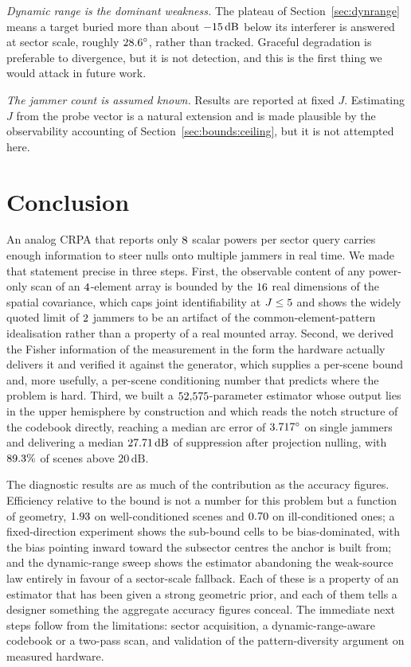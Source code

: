 \documentclass[journal]{IEEEtran}
\newcommand{\dB}{\,\mathrm{dB}}
\newcommand{\degs}{^\circ}
\begin{document}
\emph{Dynamic range is the dominant weakness.} The plateau of
Section~\ref{sec:dynrange} means a target buried more than about
$\drPlateauOnset\dB$ below its interferer is answered at sector scale, roughly
$\sectorRadius\degs$, rather than tracked. Graceful degradation is preferable
to divergence, but it is not detection, and this is the first thing we would
attack in future work.

\emph{The jammer count is assumed known.} Results are reported at fixed $J$.
Estimating $J$ from the probe vector is a natural extension and is made
plausible by the observability accounting of
Section~\ref{sec:bounds:ceiling}, but it is not attempted here.

\section{Conclusion}
\label{sec:concl}

An analog CRPA that reports only $8$ scalar powers per sector query
carries enough information to steer nulls onto multiple jammers in real time.
We made that statement precise in three steps. First, the observable content of
any power-only scan of an $4$-element array is bounded by the
$16$ real dimensions of the spatial covariance, which caps joint
identifiability at $J \le 5$ and shows the widely quoted limit of
$2$ jammers to be an artifact of the common-element-pattern
idealisation rather than a property of a real mounted array. Second, we derived
the Fisher information of the measurement in the form the hardware actually
delivers it and verified it against the generator, which supplies a per-scene
bound and, more usefully, a per-scene conditioning number that predicts where
the problem is hard. Third, we built a $52{,}575$-parameter estimator
whose output lies in the upper hemisphere by construction and which reads the
notch structure of the codebook directly, reaching a median arc error of
$\netArcPfifty\degs$ on single jammers and delivering a median
$\jsrMed\dB$ of suppression after projection nulling, with $89.3\%$ of
scenes above $20\dB$.

The diagnostic results are as much of the contribution as the accuracy
figures. Efficiency relative to the bound is not a number for this problem but
a function of geometry, $1.93$ on well-conditioned scenes and $0.70$ on
ill-conditioned ones; a fixed-direction experiment shows the sub-bound cells to
be bias-dominated, with the bias pointing inward toward the subsector centres
the anchor is built from; and the dynamic-range sweep shows the estimator
abandoning the weak-source law entirely in favour of a sector-scale fallback.
Each of these is a property of an estimator that has been given a strong
geometric prior, and each of them tells a designer something the aggregate
accuracy figures conceal. The immediate next steps follow from the limitations:
sector acquisition, a dynamic-range-aware codebook or a two-pass scan, and
validation of the pattern-diversity argument on measured hardware.


\end{document}
